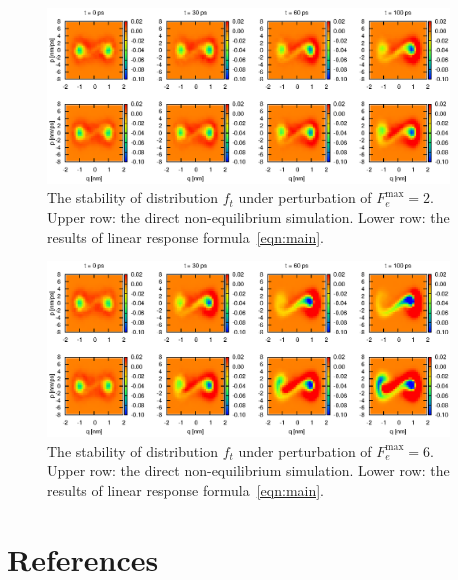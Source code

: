 \documentclass[aip,jcp,a4paper,reprint,onecolumn]{revtex4-1}
\begin{document}
\begin{figure}
  \centering
  \includegraphics[width=0.95\textwidth]
  {figs/warm100.str2.0.nst1e09.smallgrid/fig-2d.eps}
  \caption{The stability of distribution $f_t$ under perturbation of
    $F_e^{\textrm{max}} = 2$.
    Upper row: the direct non-equilibrium simulation. Lower row: the
    results of linear response formula~\eqref{eqn:main}.
  }
  \label{fig:tmp2}
\end{figure}

\begin{figure}
  \centering
  \includegraphics[width=0.95\textwidth]
  {figs/warm100.str6.0.nst1e09.smallgrid/fig-2d.eps}
  \caption{The stability of distribution $f_t$ under perturbation of
    $F_e^{\textrm{max}} = 6$.  Upper row: the direct non-equilibrium
    simulation. Lower row: the results of linear response
    formula~\eqref{eqn:main}.  }
  \label{fig:tmp3}
\end{figure}


\section*{References}
{}

\end{document}

